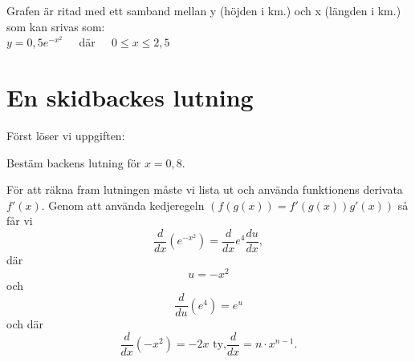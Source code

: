 \documentclass[a4paper,12pt]{article}
\begin{document}
\noindent
{}\newline
Grafen är ritad med ett samband mellan y (höjden i km.) och x (längden i km.) som kan srivas som:\\
$y = 0,5e^{-x^2}$ $\>$ $\>$ där $\>$ $\>$ $0 \leq x \leq 2,5$\\
\section{En skidbackes lutning}
\label{sec:uppg1}
  Först löser vi uppgiften:\\
  \begin{addmargin}[1em]{1em}
    Bestäm backens lutning för $x = 0,8$.\\
  \end{addmargin}
  För att räkna fram lutningen måste vi lista ut och använda funktionens derivata $f'(x)$. Genom att använda kedjeregeln $(f(g(x)) = f'(g(x))g'(x))$ så får vi
  \begin{equation}
    \frac{d}{dx}\left(e^{-x^2}\right) = \frac{d}{dx}e^4\frac{du}{dx},
  \end{equation}
  där
  \begin{displaymath}
    u = -x^2
  \end{displaymath}
  och
  \begin{displaymath}
    \frac{d}{du}\left(e^4\right) = e^u
  \end{displaymath}
  och där
  \begin{displaymath}
    \frac{d}{dx}\left(-x^2\right) = -2x \text{ ty,} \frac{d}{dx} = n \cdot x^{n-1}.
  \end{displaymath}
\end{document}
